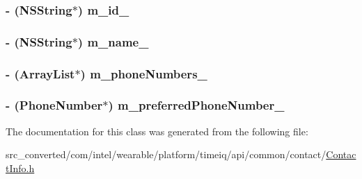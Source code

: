 \subsubsection[{m\+\_\+id\+\_\+}]{\setlength{\rightskip}{0pt plus 5cm}-\/ (N\+S\+String$\ast$) m\+\_\+id\+\_\+}\label{interface_contact_info_a40d0e1360de3473fdd1334fe34c99f63}
\hypertarget{interface_contact_info_af22bda997f3412dc374c4e49e8ef1f5b}{}
\subsubsection[{m\+\_\+name\+\_\+}]{\setlength{\rightskip}{0pt plus 5cm}-\/ (N\+S\+String$\ast$) m\+\_\+name\+\_\+}\label{interface_contact_info_af22bda997f3412dc374c4e49e8ef1f5b}
\hypertarget{interface_contact_info_a6445dc57a7d77146ce1df8638c591068}{}
\subsubsection[{m\+\_\+phone\+Numbers\+\_\+}]{\setlength{\rightskip}{0pt plus 5cm}-\/ (Array\+List$\ast$) m\+\_\+phone\+Numbers\+\_\+}\label{interface_contact_info_a6445dc57a7d77146ce1df8638c591068}
\hypertarget{interface_contact_info_a5d96317ffff5e452c9a2c6aa167df54b}{}
\subsubsection[{m\+\_\+preferred\+Phone\+Number\+\_\+}]{\setlength{\rightskip}{0pt plus 5cm}-\/ ({\bf Phone\+Number}$\ast$) m\+\_\+preferred\+Phone\+Number\+\_\+}\label{interface_contact_info_a5d96317ffff5e452c9a2c6aa167df54b}


The documentation for this class was generated from the following file\+:\begin{DoxyCompactItemize}
\item 
src\+\_\+converted/com/intel/wearable/platform/timeiq/api/common/contact/\hyperlink{_contact_info_8h}{Contact\+Info.\+h}\end{DoxyCompactItemize}

